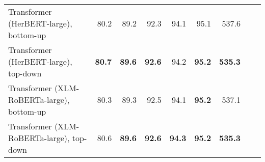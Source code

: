 \begin{table}[ht!]
{\begin{tabular}{lrrrrrrrr}
  Transformer (HerBERT-large), bottom-up & 80.2 & 89.2 & 92.3 & 94.1 & 95.1 & 537.6 \\ 
  Transformer (HerBERT-large), top-down & \textbf{80.7} & \textbf{89.6} & \textbf{92.6} & 94.2 & \textbf{95.2} & \textbf{535.3} \\ 
  Transformer (XLM-RoBERTa-large), bottom-up & 80.3 & 89.3 & 92.5 & 94.1 & \textbf{95.2} & 537.1 \\ 
  Transformer (XLM-RoBERTa-large), top-down & 80.6 & \textbf{89.6} & \textbf{92.6} & \textbf{94.3} & \textbf{95.2} & \textbf{535.3} \\ 
   \hline
\end{tabular}
}
\end{table}




